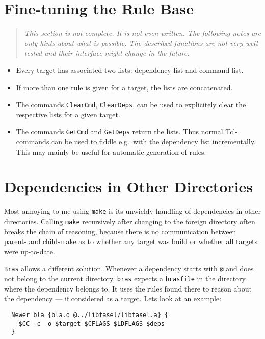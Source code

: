 \documentclass[12pt]{article}
\newcommand{\bras}{\texttt{bras}}
\newcommand{\Bras}{\texttt{Bras}}
\newcommand{\make}{\texttt{make}}
\begin{document}
\section{Fine-tuning the Rule Base}
\begin{quote}\itshape
This section is not complete. It is not even written. The following
notes are only hints about what is possible. The described functions
are not very well tested and their interface might change in the
future.
\end{quote}

\begin{itemize}
\item
Every target has associated two lists: dependency list and command list.
\item
If more than one rule is given for a target, the lists are
concatenated. 
\item
The commands \texttt{ClearCmd}, \texttt{ClearDeps},
can be used to explicitely clear the respective
lists for a given target.
\item
The commands \texttt{GetCmd} and \texttt{GetDeps}
return the lists. Thus normal Tcl-commands can be
used to fiddle e.g.\ with the dependency list incrementally. This may
mainly be useful for automatic generation of rules.
\end{itemize}


\section{Dependencies in Other Directories}
\label{secForeignDeps}

Most annoying to me using \make{} is its unwieldy handling of
dependencies in other directories. Calling \make{} recursively after
changing to the foreign directory often breaks the chain of reasoning,
because there is no communication between parent- and child-make as to
whether any target was build or whether all targets were up-to-date.

\Bras{} allows a different solution. Whenever a dependency starts with
\texttt{@} and does not belong to the current directory, \bras{} expects
a \texttt{brasfile} in the directory where the dependency belongs
to. It uses the rules found there to reason about the dependency ---
if considered as a target. Lets look at an example:

\begin{verbatim}
  Newer bla {bla.o @../libfasel/libfasel.a} {
    $CC -c -o $target $CFLAGS $LDFLAGS $deps
  }
\end{verbatim}
\end{document}
